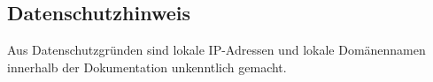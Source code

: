 \subsection{Datenschutzhinweis}\label{vw_datenschutz}
Aus Datenschutzgründen sind lokale IP-Adressen und lokale Domänennamen innerhalb der Dokumentation unkenntlich gemacht.